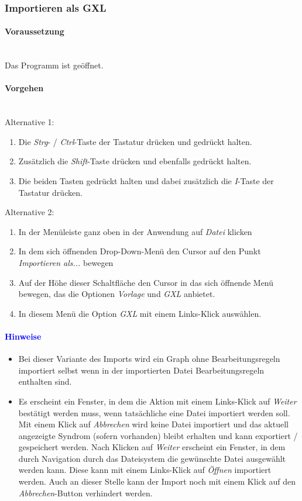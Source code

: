 \documentclass[enabledeprecatedfontcommands,fontsize=11pt,paper=a4,twoside]{scrartcl}
\newcounter{one}
\newcommand*{\hint}{\paragraph{\textcolor{blue}{Hinweise}}}
\newcommand*{\condition}{\paragraph{Voraussetzung}$\;$ \vspace{0.2cm}\\}
\newcommand*{\actions}{\paragraph{Vorgehen} $\;$\vspace{0.2cm}\\}
\begin{document}
	\subsubsection{Importieren als GXL}
		\condition 	
		Das Programm ist geöffnet.
		\actions
		Alternative 1:
		\begin{enumerate}
				\item Die \textit{Strg}- / \textit{Ctrl}-Taste der Tastatur drücken und gedrückt halten.
				\item Zusätzlich die \textit{Shift}-Taste drücken und ebenfalls gedrückt halten.
				\item Die beiden Tasten gedrückt halten und dabei zusätzlich die \textit{I}-Taste der Tastatur drücken.
		\end{enumerate}				
		Alternative 2:
		\begin{enumerate}
				\item In der Menüleiste ganz oben in der Anwendung auf \textit{Datei} klicken 
				\item In dem sich öffnenden Drop-Down-Menü den Cursor auf den Punkt \textit{Importieren als...} bewegen
				\item Auf der Höhe dieser Schaltfläche den Cursor in das sich öffnende Menü bewegen, das die Optionen \textit{Vorlage} und \textit{GXL} anbietet.
				\item In diesem Menü die Option \textit{GXL} mit einem Links-Klick auswählen.
		\end{enumerate}		
		\hint
		\begin{itemize}
				\item Bei dieser Variante des Imports wird ein Graph ohne Bearbeitungsregeln importiert selbst wenn in der importierten Datei Bearbeitungsregeln enthalten sind.
				\item Es erscheint ein Fenster, in dem die Aktion mit einem Links-Klick auf \textit{Weiter} bestätigt werden muss, wenn tatsächliche eine Datei importiert werden soll. Mit einem Klick auf \textit{Abbrechen} wird keine Datei importiert und das aktuell angezeigte Syndrom (sofern vorhanden) bleibt erhalten und kann exportiert / gespeichert werden. Nach Klicken auf \textit{Weiter} erscheint ein Fenster, in dem durch Navigation durch das Dateisystem die gewünschte Datei ausgewählt werden kann. Diese kann mit einem Links-Klick auf \textit{Öffnen} importiert werden. Auch an dieser Stelle kann der Import noch mit einem Klick auf den \textit{Abbrechen}-Button verhindert werden.
		\end{itemize}
		
\end{document}
